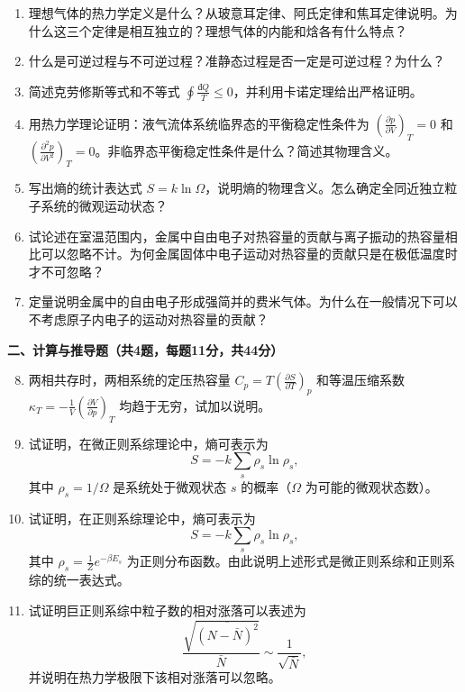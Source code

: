 \documentclass[12pt,a4paper,fontset=mac]{ctexart}
\newcommand{\đ}{\mathrm{đ}}
\begin{document}
\begin{enumerate}
\item 理想气体的热力学定义是什么？从玻意耳定律、阿氏定律和焦耳定律说明。为什么这三个定律是相互独立的？理想气体的内能和焓各有什么特点？

\item 什么是可逆过程与不可逆过程？准静态过程是否一定是可逆过程？为什么？

\item 简述克劳修斯等式和不等式 $\oint \frac{\đ Q}{T} \le 0$，并利用卡诺定理给出严格证明。

\item 用热力学理论证明：液气流体系统临界态的平衡稳定性条件为 $\left(\frac{\partial p}{\partial V}\right)_T = 0$ 和 $\left(\frac{\partial^2 p}{\partial V^2}\right)_T = 0$。非临界态平衡稳定性条件是什么？简述其物理含义。

\item 写出熵的统计表达式 $S = k\ln\Omega$，说明熵的物理含义。怎么确定全同近独立粒子系统的微观运动状态？

\item 试论述在室温范围内，金属中自由电子对热容量的贡献与离子振动的热容量相比可以忽略不计。为何金属固体中电子运动对热容量的贡献只是在极低温度时才不可忽略？

\item 定量说明金属中的自由电子形成强简并的费米气体。为什么在一般情况下可以不考虑原子内电子的运动对热容量的贡献？
\end{enumerate}

\newpage

\noindent\textbf{二、计算与推导题（共4题，每题11分，共44分）}

\begin{enumerate}
\setcounter{enumi}{7}
\item 两相共存时，两相系统的定压热容量 $C_p = T\left(\frac{\partial S}{\partial T}\right)_p$ 和等温压缩系数 $\kappa_T = -\frac{1}{V}\left(\frac{\partial V}{\partial p}\right)_T$ 均趋于无穷，试加以说明。

\item 试证明，在微正则系综理论中，熵可表示为
\[
S = -k\sum_s \rho_s\ln\rho_s,
\]
其中 $\rho_s = 1/\Omega$ 是系统处于微观状态 $s$ 的概率（$\Omega$ 为可能的微观状态数）。

\item 试证明，在正则系综理论中，熵可表示为
\[
S = -k\sum_s \rho_s\ln\rho_s,
\]
其中 $\rho_s = \frac{1}{Z}e^{-\beta E_s}$ 为正则分布函数。由此说明上述形式是微正则系综和正则系综的统一表达式。

\item 试证明巨正则系综中粒子数的相对涨落可以表述为
\[
\frac{\sqrt{\overline{(N - \bar{N})^2}}}{\bar{N}} \sim \frac{1}{\sqrt{\bar{N}}},
\]
并说明在热力学极限下该相对涨落可以忽略。
\end{enumerate}
\end{document}

